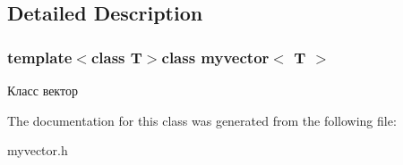 \subsection{Detailed Description}
\subsubsection*{template$<$class T$>$class myvector$<$ T $>$}

Класс вектор 

The documentation for this class was generated from the following file\+:\begin{DoxyCompactItemize}
\item 
myvector.\+h\end{DoxyCompactItemize}
